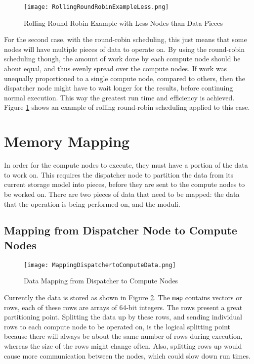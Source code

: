 \begin{figure}[t!]
\centering
\texttt{[image: RollingRoundRobinExampleLess.png]}
\caption{Rolling Round Robin Example with Less Nodes than Data Pieces}
\label{fig:RollingRoundRobinExampleLess}
\end{figure}
For the second case, with the round-robin scheduling, this just means that some nodes will have multiple pieces of data to operate on. By using the round-robin scheduling though, the amount of work done by each compute node should be about equal, and thus evenly spread over the compute nodes. If work was unequally proportioned to a single compute node, compared to others, then the dispatcher node might have to wait longer for the results, before continuing normal execution. This way the greatest run time and efficiency is achieved. Figure \ref{fig:RollingRoundRobinExampleLess} shows an example of rolling round-robin scheduling applied to this case.

\section{Memory Mapping} \label{sec:DistributedMemoryMapping}
In order for the compute nodes to execute, they must have a portion of the data to work on. This requires the dispatcher node to partition the data from its current storage model into pieces, before they are sent to the compute nodes to be worked on. There are two pieces of data that need to be mapped: the data that the operation is being performed on, and the moduli.

\subsection{Mapping from Dispatcher Node to Compute Nodes}
\begin{figure}[t!]
\centering
\texttt{[image: MappingDispatchertoComputeData.png]}
\caption{Data Mapping from Dispatcher to Compute Nodes}
\label{fig:MappingDispatcherToComputeData}
\end{figure}
Currently the data is stored as shown in Figure \ref{fig:MappingDispatcherToComputeData}. The \verb|map| contains vectors or rows, each of these rows are arrays of 64-bit integers. The rows present a great partitioning point. Splitting the data up by these rows, and sending individual rows to each compute node to be operated on, is the logical splitting point because there will always be about the same number of rows during execution, whereas the size of the rows might change often. Also, splitting rows up would cause more communication between the nodes, which could slow down run times. 


